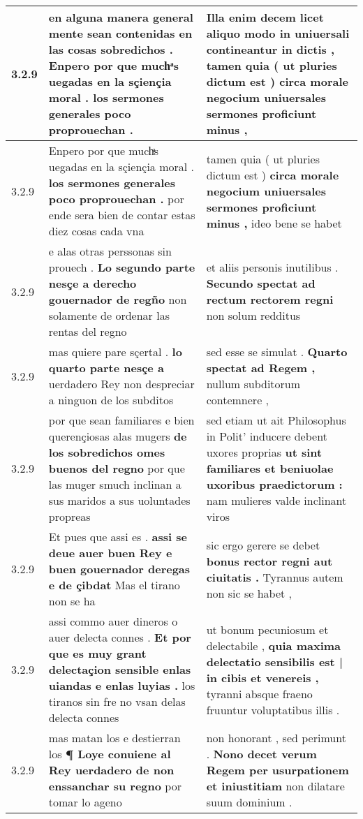 \begin{tabular}{|p{1cm}|p{6.5cm}|p{6.5cm}|}
3.2.9 & en alguna manera general mente sean contenidas en las cosas sobredichos . \textbf{ Enpero por que muchͣs uegadas en la sçiençia moral . } los sermones generales poco proprouechan . & Illa enim decem licet aliquo modo in uniuersali contineantur in dictis , \textbf{ tamen quia ( ut pluries dictum est ) } circa morale negocium uniuersales sermones proficiunt minus , \\\hline
3.2.9 & Enpero por que muchͣs uegadas en la sçiençia moral . \textbf{ los sermones generales poco proprouechan . } por ende sera bien de contar estas diez cosas cada vna & tamen quia ( ut pluries dictum est ) \textbf{ circa morale negocium uniuersales sermones proficiunt minus , } ideo bene se habet \\\hline
3.2.9 & e alas otras perssonas sin prouech . \textbf{ Lo segundo parte nesçe a derecho gouernador de regño } non solamente de ordenar las rentas del regno & et aliis personis inutilibus . \textbf{ Secundo spectat ad rectum rectorem regni } non solum redditus \\\hline
3.2.9 & mas quiere pare sçertal . \textbf{ lo quarto parte nesçe a } uerdadero Rey non despreciar a ninguon de los subditos & sed esse se simulat . \textbf{ Quarto spectat ad Regem , } nullum subditorum contemnere , \\\hline
3.2.9 & por que sean familiares e bien querençiosas alas mugers \textbf{ de los sobredichos omes buenos del regno } por que las muger smuch inclinan a sus maridos a sus uoluntades propreas & sed etiam ut ait Philosophus in Polit’ inducere debent uxores proprias \textbf{ ut sint familiares et beniuolae uxoribus praedictorum : } nam mulieres valde inclinant viros \\\hline
3.2.9 & Et pues que assi es . \textbf{ assi se deue auer buen Rey e buen gouernador deregas e de çibdat } Mas el tirano non se ha & sic ergo gerere se debet \textbf{ bonus rector regni aut ciuitatis . } Tyrannus autem non sic se habet , \\\hline
3.2.9 & assi commo auer dineros o auer delecta connes . \textbf{ Et por que es muy grant delectaçion sensible enlas uiandas e enlas luyias . } los tiranos sin fre no vsan delas delecta connes & ut bonum pecuniosum et delectabile , \textbf{ quia maxima delectatio sensibilis est | in cibis et venereis , } tyranni absque fraeno fruuntur voluptatibus illis . \\\hline
3.2.9 & mas matan los e destierran los \textbf{ ¶ Loye conuiene al Rey uerdadero de non enssanchar su regno } por tomar lo ageno & non honorant , sed perimunt . \textbf{ Nono decet verum Regem per usurpationem et iniustitiam } non dilatare suum dominium . \\\hline

\end{tabular}
